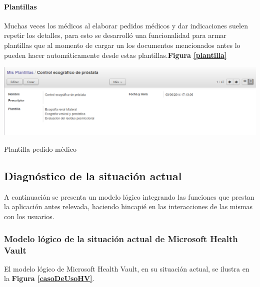 \paragraph{Plantillas}

Muchas veces los médicos al elaborar pedidos médicos y dar indicaciones suelen repetir los detalles, para esto se desarrolló una funcionalidad para armar plantillas que al momento de cargar un los documentos mencionados antes lo pueden hacer automáticamente desde estas plantillas.\textbf{Figura \ref{plantilla}}


\begin{correccionFigure}[h]
      \centering
      \includegraphics[width=.8\textwidth]{img/tp1/HE/PlantillaPM}
      \caption{Plantilla pedido médico}
      \label{plantilla}
\end{correccionFigure}

\subsection{Diagnóstico de la situación actual}
A continuación se presenta un modelo lógico integrando las funciones que prestan la aplicación antes relevada, haciendo hincapié en las interacciones de las mismas con los usuarios.


\subsubsection{Modelo lógico de la situación actual de Microsoft Health Vault}

El modelo lógico de Microsoft Health Vault, en su situación actual, se ilustra en la \textbf{Figura \ref{casoDeUsoHV}}.

